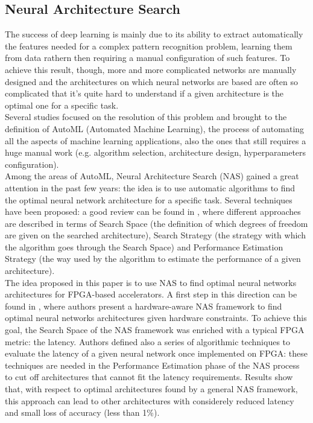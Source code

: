 \documentclass[11pt,a4paper]{article}
\begin{document}
\subsection{Neural Architecture Search}
The success of deep learning is mainly due to its ability to extract automatically the features needed for a complex pattern recognition problem, learning them from data rathern then requiring a manual configuration of such features. To achieve this result, though, more and more complicated networks are manually designed and the architectures on which neural networks are based are often so complicated that it's quite hard to understand if a given architecture is the optimal one for a specific task.
\\Several studies focused on the resolution of this problem and brought to the definition of AutoML (Automated Machine Learning), the process of automating all the aspects of machine learning applications, also the ones that still requires a huge manual work (e.g. algorithm selection, architecture design, hyperparameters configuration).
\\Among the areas of AutoML, Neural Architecture Search (NAS) gained a great attention in the past few years: the idea is to use automatic algorithms to find the optimal neural network architecture for a specific task. Several techniques have been proposed: a good review can be found in \cite{elsken_nas_2018}, where different approaches are described in terms of Search Space (the definition of which degrees of freedom are given on the searched architecture), Search Strategy (the strategy with which the algorithm goes through the Search Space) and Performance Estimation Strategy (the way used by the algorithm to estimate the performance of a given architecture).
\\The idea proposed in this paper is to use NAS to find optimal neural networks architectures for FPGA-based accelerators. A first step in this direction can be found in \cite{jiang_nas_fpga_2019}, where authors present a hardware-aware NAS framework to find optimal neural networks architectures given hardware constraints. To achieve this goal, the Search Space of the NAS framework was enriched with a typical FPGA metric: the latency. Authors defined also a series of algorithmic techniques to evaluate the latency of a given neural network once implemented on FPGA: these techniques are needed in the Performance Estimation phase of the NAS process to cut off architectures that cannot fit the latency requirements. Results show that, with respect to optimal architectures found by a general NAS framework, this approach can lead to other architectures with considerely reduced latency and small loss of accuracy (less than 1\%).
\end{document}
